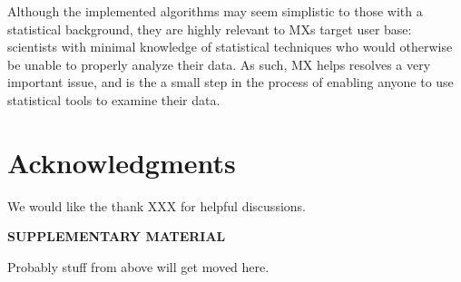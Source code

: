 \documentclass[12pt]{article}
\begin{document}
Although the implemented algorithms may seem simplistic to those with a statistical background, they are highly relevant to MXs target user base: scientists with minimal knowledge of statistical techniques who would otherwise be unable to properly analyze their data. As such, MX helps resolves a very important issue, and is the a small step in the process of enabling anyone to use statistical tools to examine their data.

\section{Acknowledgments}
\label{sec:ack}
We would like the thank XXX for helpful discussions.

\bigskip
\begin{center}
{\large\bf SUPPLEMENTARY MATERIAL}
\end{center}

Probably stuff from above will get moved here.




\end{document}
